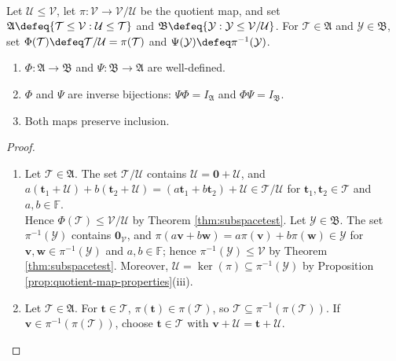 \begin{theorem} \label{thm:subspace-correspondence-quotient} \\
Let $\mathcal{U}\leq\mathcal{V}$, let $\pi:\mathcal{V}\to\mathcal{V}/\mathcal{U}$ be the quotient map, and set $\mathfrak{A}\defeq\{\mathcal{T}\leq\mathcal{V}:\mathcal{U}\leq\mathcal{T}\}$ and $\mathfrak{B}\defeq\{\mathcal{Y}:\mathcal{Y}\leq\mathcal{V}/\mathcal{U}\}$. For $\mathcal{T}\in\mathfrak{A}$ and $\mathcal{Y}\in\mathfrak{B}$, set $\Phi(\mathcal{T})\defeq\mathcal{T}/\mathcal{U}=\pi(\mathcal{T})$ and $\Psi(\mathcal{Y})\defeq\pi^{-1}(\mathcal{Y})$.
\begin{enumerate}[label=(\roman*)]
\setlength{\itemsep}{0pt}
\item $\Phi:\mathfrak{A}\to\mathfrak{B}$ and $\Psi:\mathfrak{B}\to\mathfrak{A}$ are well-defined.
\item $\Phi$ and $\Psi$ are inverse bijections: $\Psi\Phi=I_{\mathfrak{A}}$ and $\Phi\Psi=I_{\mathfrak{B}}$.
\item Both maps preserve inclusion.
\end{enumerate}
\begin{proof}
\begin{enumerate}[label=(\roman*)]
\setlength{\itemsep}{0pt}
\item Let $\mathcal{T}\in\mathfrak{A}$. The set $\mathcal{T}/\mathcal{U}$ contains $\mathcal{U}=\mathbf{0}+\mathcal{U}$, and $a(\mathbf{t}_1+\mathcal{U})+b(\mathbf{t}_2+\mathcal{U})=(a\mathbf{t}_1+b\mathbf{t}_2)+\mathcal{U}\in\mathcal{T}/\mathcal{U}$ for $\mathbf{t}_1,\mathbf{t}_2\in\mathcal{T}$ and $a,b\in\mathbb{F}$.\\
Hence $\Phi(\mathcal{T})\leq\mathcal{V}/\mathcal{U}$ by Theorem \ref{thm:subspacetest}. Let $\mathcal{Y}\in\mathfrak{B}$. The set $\pi^{-1}(\mathcal{Y})$ contains $\mathbf{0}_{\mathcal{V}}$, and $\pi(a\mathbf{v}+b\mathbf{w})=a\pi(\mathbf{v})+b\pi(\mathbf{w})\in\mathcal{Y}$ for $\mathbf{v},\mathbf{w}\in\pi^{-1}(\mathcal{Y})$ and $a,b\in\mathbb{F}$; hence $\pi^{-1}(\mathcal{Y})\leq\mathcal{V}$ by Theorem \ref{thm:subspacetest}. Moreover, $\mathcal{U}=\ker(\pi)\subseteq\pi^{-1}(\mathcal{Y})$ by Proposition \ref{prop:quotient-map-properties}(iii).
\item Let $\mathcal{T}\in\mathfrak{A}$. For $\mathbf{t}\in\mathcal{T}$, $\pi(\mathbf{t})\in\pi(\mathcal{T})$, so $\mathcal{T}\subseteq\pi^{-1}(\pi(\mathcal{T}))$. If $\mathbf{v}\in\pi^{-1}(\pi(\mathcal{T}))$, choose $\mathbf{t}\in\mathcal{T}$ with $\mathbf{v}+\mathcal{U}=\mathbf{t}+\mathcal{U}$.\\

\end{enumerate}
\end{proof}
\end{theorem}
